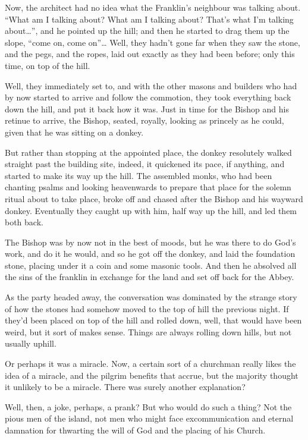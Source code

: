 \documentclass[
  12pt,
  a5paper,
  twoside]{book}
\begin{document}
Now, the architect had no idea what the Franklin's neighbour was talking
about. ``What am I talking about? What am I talking about? That's what
I'm talking about\ldots{}'', and he pointed up the hill; and then he
started to drag them up the slope, ``come on, come on''\ldots{} Well,
they hadn't gone far when they saw the stone, and the pegs, and the
ropes, laid out exactly as they had been before; only this time, on top
of the hill.

Well, they immediately set to, and with the other masons and builders
who had by now started to arrive and follow the commotion, they took
everything back down the hill, and put it back how it was. Just in time
for the Bishop and his retinue to arrive, the Bishop, seated, royally,
looking as princely as he could, given that he was sitting on a donkey.

But rather than stopping at the appointed place, the donkey resolutely
walked straight past the building site, indeed, it quickened its pace,
if anything, and started to make its way up the hill. The assembled
monks, who had been chanting psalms and looking heavenwards to prepare
that place for the solemn ritual about to take place, broke off and
chased after the Bishop and his wayward donkey. Eventually they caught
up with him, half way up the hill, and led them both back.

The Bishop was by now not in the best of moods, but he was there to do
God's work, and do it he would, and so he got off the donkey, and laid
the foundation stone, placing under it a coin and some masonic tools.
And then he absolved all the sins of the franklin in exchange for the
land and set off back for the Abbey.

As the party headed away, the conversation was dominated by the strange
story of how the stones had somehow moved to the top of hill the
previous night. If they'd been placed on top of the hill and rolled
down, well, that would have been weird, but it sort of makes sense.
Things are always rolling down hills, but not usually uphill.

Or perhaps it was a miracle. Now, a certain sort of a churchman really
likes the idea of a miracle, and the pilgrim benefits that accrue, but
the majority thought it unlikely to be a miracle. There was surely
another explanation?

Well, then, a joke, perhaps, a prank? But who would do such a thing? Not
the pious men of the island, not men who might face excommunication and
eternal damnation for thwarting the will of God and the placing of his
Church.
\end{document}
